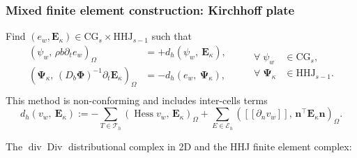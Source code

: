 \documentclass[aspectratio=169]{beamer}
\DeclareMathOperator*{\Div}{Div}
\renewcommand{\div}{\operatorname{div}}
\DeclareMathOperator*{\Hess}{Hess}
\DeclareMathOperator*{\curl}{curl}
\newcommand{\bbR}{\mathbb{R}}
\newcommand{\inpr}[3][]{\ensuremath{( #2, \, #3 )_{#1}}}
\begin{document}
\begin{frame}[fragile]\frametitle{Mixed finite element construction: Kirchhoff plate}
	
	
	Find $(e_w, \bm{E}_\kappa) \in \mathrm{CG}_s \times \mathrm{HHJ}_{s-1}$ such that
	\begin{equation*}
		\begin{aligned}
			\inpr[\Omega]{\psi_w}{\rho b \partial_t {e}_w} &= +d_h(\psi_w, \ \bm{E}_{\kappa}), \\ 
			\inpr[\Omega]{\bm{\Psi}_\kappa}{(D_b \bm{\Phi})^{-1}\partial_t {\bm{E}}_\kappa} &= -d_h(e_w, \ \bm{\Psi}_{\kappa}), \\ 
		\end{aligned} \qquad
		\begin{aligned}
			\forall \; \psi_w &\in \mathrm{CG}_s, \\
			\forall \; \bm{\Psi}_{\kappa} &\in \mathrm{HHJ}_{s-1}. \\
		\end{aligned}
	\end{equation*}
This method is non-conforming and includes inter-cells terms
	\begin{equation*}
		d_h(v_w, \ \bm{E}_{\kappa}) := - \sum_{T \in \mathcal{T}_h} \inpr[\Omega]{\Hess v_w}{\bm{E}_\kappa} + \sum_{E \in \mathcal{E}_h} \inpr[\Omega]{[\![\partial_n v_w]\!]}{\bm{n}^\top\bm{E}_\kappa \bm{n}}. 
	\end{equation*}
	
	The $\div\Div$ distributional complex in 2D and the HHJ finite element complex:
	\begin{figure}[h] 
		\centering
	\end{figure}
\end{frame}
\end{document}
